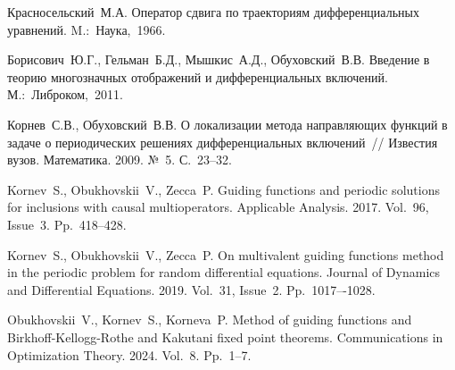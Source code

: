 %

\begin{thebibliography}{9} %

 Красносельский~М.А. Оператор сдвига по траекториям дифференциальных уравнений. M.:~Наука,~1966.

 Борисович~Ю.Г., Гельман~Б.Д., Мышкис~А.Д., Обуховский~В.В. Введение в теорию многозначных отображений и дифференциальных включений. М.:~Либроком,~2011.

 Корнев~С.В., Обуховский~В.В. О локализации метода направляющих функций в задаче о периодических решениях дифференциальных включений~// Известия вузов. Математика. 2009. №~5. С.~23--32.

 Kornev~S., Obukhovskii~V., Zecca~P. Guiding functions and periodic solutions for inclusions with causal multioperators. Applicable Analysis. 2017. Vol.~96, Issue~3. Pp.~418--428.

 Kornev~S., Obukhovskii~V., Zecca~P. On multivalent guiding functions method in the periodic problem for random differential equations. Journal of Dynamics and Differential Equations. 2019. Vol.~31, Issue~2. Pp.~1017–-1028.

   Obukhovskii~V., Kornev~S., Korneva~P. Method of guiding functions and Birkhoff-Kellogg-Rothe and Kakutani fixed point theorems. Communications in Optimization Theory. 2024. Vol.~8. Pp.~1--7.

\end{thebibliography}





%
